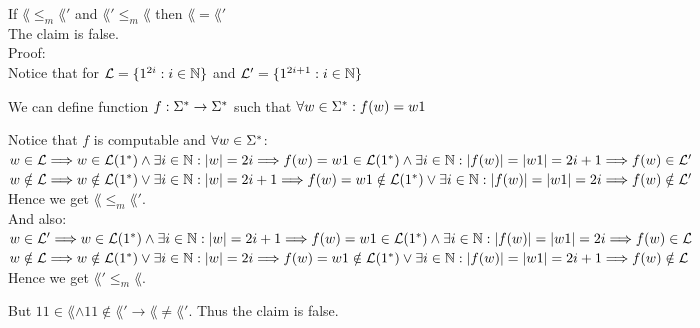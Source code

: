 If $\lang \leq_m \lang'$ and $\lang' \leq_m \lang$ then $\lang = \lang'$ \\

The claim is false. \\

Proof: \\
Notice that for $\mathcal{L} = \{1^{2i} : i \in \mathbb{N}\}$ and
$\mathcal{L}' = \{1^{2i+1} : i \in \mathbb{N}\}$

We can define function $f: \Sigma^* \rightarrow \Sigma^*$ such that $\forall w \in \Sigma^*: f(w) = w1$

Notice that $f$ is computable and $\forall w \in \Sigma^*$: \\
$w \in \mathcal{L} \\
    \Longrightarrow w \in \mathcal{L}(1^*) \wedge \exists i \in \mathbb{N}: |w| = 2i \\
    \Longrightarrow f(w) = w1 \in \mathcal{L}(1^*) \wedge \exists i \in \mathbb{N}: |f(w)| = |w1| = 2i+1  \\
    \Longrightarrow f(w) \in \mathcal{L}'$ \\

$w \notin \mathcal{L} \\
    \Longrightarrow w \notin \mathcal{L}(1^*) \vee \exists i \in \mathbb{N}: |w| = 2i+1 \\
    \Longrightarrow f(w) = w1 \notin \mathcal{L}(1^*) \vee \exists i \in \mathbb{N}: |f(w)| = |w1| = 2i \\
    \Longrightarrow f(w) \notin \mathcal{L}'$ \\

Hence we get $\lang \leq_m \lang'$. \\

And also: \\
$w \in \mathcal{L}' \\
    \Longrightarrow w \in \mathcal{L}(1^*) \wedge \exists i \in \mathbb{N}: |w| = 2i+1 \\
    \Longrightarrow f(w) = w1 \in \mathcal{L}(1^*) \wedge \exists i \in \mathbb{N}: |f(w)| = |w1| = 2i \\
    \Longrightarrow f(w) \in \mathcal{L}$ \\

$w \notin \mathcal{L} \\
    \Longrightarrow w \notin \mathcal{L}(1^*) \vee \exists i \in \mathbb{N}: |w| = 2i \\
    \Longrightarrow f(w) = w1 \notin \mathcal{L}(1^*) \vee \exists i \in \mathbb{N}: |f(w)| = |w1| = 2i+1 \\
    \Longrightarrow f(w) \notin \mathcal{L}$ \\

Hence we get $\lang' \leq_m \lang$.

But $11 \in \lang \wedge 11 \notin \lang' \rightarrow \lang \neq \lang'$. Thus the claim is false. \\
